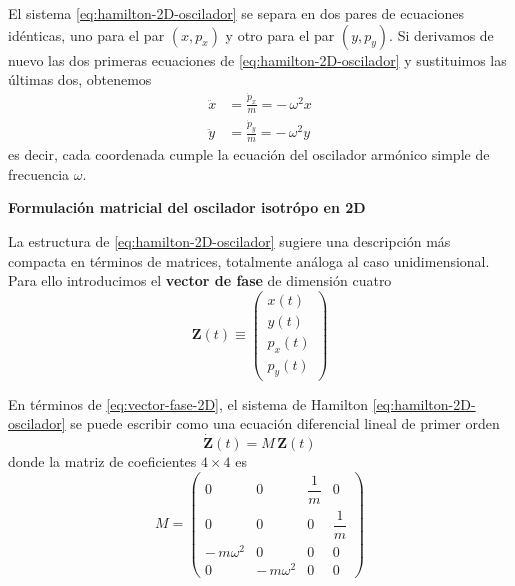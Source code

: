 \documentclass{article}
\begin{document}
El sistema \eqref{eq:hamilton-2D-oscilador} se separa en dos pares de ecuaciones
idénticas, uno para el par $(x,p_{x})$ y otro para el par $(y,p_{y})$. Si
derivamos de nuevo las dos primeras ecuaciones de
\eqref{eq:hamilton-2D-oscilador} y sustituimos las últimas dos, obtenemos
\begin{equation}
\begin{split}
\ddot{x} &= \frac{\dot{p}_{x}}{m}
         = -\,\omega^{2}x \\[4pt]
\ddot{y} &= \frac{\dot{p}_{y}}{m}
         = -\,\omega^{2}y
\end{split}
\label{eq:edo-2D-oscilador}
\end{equation}
es decir, cada coordenada cumple la ecuación del oscilador armónico simple
de frecuencia $\omega$.

\textcolor{trueblue}{\textbf{Formulación matricial del oscilador isotrópo en 2D}}

La estructura de \eqref{eq:hamilton-2D-oscilador} sugiere una descripción más
compacta en términos de matrices, totalmente análoga al caso unidimensional.
Para ello introducimos el \textbf{vector de fase} de dimensión cuatro
\begin{equation}
\mathbf{Z}(t) \equiv
\begin{pmatrix}
x(t) \\[4pt]
y(t) \\[4pt]
p_{x}(t) \\[4pt]
p_{y}(t)
\end{pmatrix}
\label{eq:vector-fase-2D}
\end{equation}

En términos de \eqref{eq:vector-fase-2D}, el sistema de Hamilton
\eqref{eq:hamilton-2D-oscilador} se puede escribir como una ecuación diferencial
lineal de primer orden
\begin{equation}
\dot{\mathbf{Z}}(t) = M\,\mathbf{Z}(t)
\label{eq:sistema-matricial-2D}
\end{equation}
donde la matriz de coeficientes $4\times 4$ es
\begin{equation}
M =
\begin{pmatrix}
0       & 0       & \dfrac{1}{m} & 0 \\[6pt]
0       & 0       & 0            & \dfrac{1}{m} \\[6pt]
-\,m\omega^{2} & 0 & 0           & 0 \\[6pt]
0       & -\,m\omega^{2} & 0     & 0
\end{pmatrix}
\label{eq:matriz-M-2D}
\end{equation}
\end{document}
